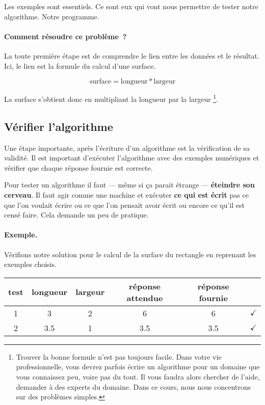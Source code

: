 			Les exemples sont essentiels. Ce sont eux qui vont nous permettre de
			tester notre algorithme. Notre programme. 

			\paragraph{Comment résoudre ce problème~?} 
			La toute première étape est de comprendre 
			le lien entre les données et le résultat. 
			Ici, le lien est la formule du calcul d'une surface.  
			
			\[
				\textrm{surface} = \textrm{longueur} * \textrm{largeur}
			\]

			La surface s’obtient donc en multipliant la longueur par la largeur%
			\footnote{%
				Trouver la bonne formule n’est pas toujours facile.
				Dans votre vie professionnelle, 
				vous devrez parfois écrire un algorithme
				pour un domaine que vous connaissez peu,
				voire pas du tout.
				Il vous faudra alors chercher de l’aide,
				demander à des experts du domaine.
				Dans ce cours,
				nous nous concentrons sur des problèmes simples.
			}.
		
		\subsection{Vérifier l’algorithme}
	
			Une étape importante, après l'écriture d'un algorithme est la
			vérification de sa validité. Il est important d'exécuter
			l’algorithme avec des exemples numériques et vérifier que chaque 
			réponse fournie est correcte.

			Pour tester un algorithme il faut — même si ça parait étrange
			— \textbf{éteindre son cerveau}.  Il faut agir comme une machine et
			exécuter \textbf{ce qui est écrit} pas ce que l'on voulait écrire ou
			ce que l'on pensait avoir écrit ou encore ce qu’il est censé faire.
			Cela demande un peu de pratique.

			\paragraph{Exemple.} 
			Vérifions notre solution 
			pour le calcul de la surface du rectangle
			en reprenant les exemples choisis.
			
			\begin{center}
			\begin{tabular}{|c|cccc|c|}
			\hline
			\rowcolor{black!40}
			test \no & longueur & largeur & réponse attendue 
				& réponse fournie & {} \\
			\hline 
			1 & 3   & 2 & 6   & 6   & {\color{ForestGreen}$\checkmark$} \\\hline
			2 & 3.5 & 1 & 3.5 & 3.5 & {\color{ForestGreen}$\checkmark$} \\\hline
			\end{tabular}
			\end{center}				
		


